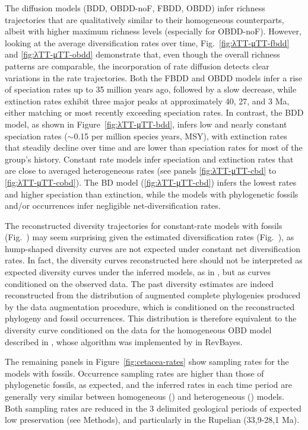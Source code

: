 \documentclass[oupdraft]{sysbio}
\begin{document}
The diffusion models (BDD, OBDD-noF, FBDD, OBDD) infer richness trajectories that are qualitatively similar to their homogeneous counterparts, albeit with higher maximum richness levels (especially for OBDD-noF). However, looking at the average diversification rates over time, Fig.~\ref{fig:λTT-μTT-fbdd} and \ref{fig:λTT-μTT-obdd} demonstrate that, even though the overall richness patterns are comparable, the incorporation of rate diffusion detects clear variations in the rate trajectories. Both the FBDD and OBDD models infer a rise of speciation rates up to 35 million years ago, followed by a slow decrease, while extinction rates exhibit three major peaks at approximately 40, 27, and 3 Ma, either matching or most recently exceeding speciation rates. In contrast, the BDD model, as shown in Figure~\ref{fig:λTT-μTT-bdd}, infers low and nearly constant speciation rates ($\sim$0.15 per million species years, MSY), with extinction rates that steadily decline over time and are lower than speciation rates for most of the group's history. Constant rate models infer speciation and extinction rates that are close to averaged heterogeneous rates (see panels \ref{fig:λTT-μTT-cbd} to \ref{fig:λTT-μTT-cobd}). The BD model (\ref{fig:λTT-μTT-cbd}) infers the lowest rates and higher speciation than extinction, while the models with phylogenetic fossils and/or occurrences infer negligible net-diversification rates.

The reconstructed diversity trajectories for constant-rate models with fossils (Fig.~) may seem surprising given the estimated diversification rates (Fig.~), as hump-shaped diversity curves are not expected under constant net diversification rates. In fact, the diversity curves reconstructed here should not be interpreted as expected diversity curves under the inferred models, as in \citet{etienne_diversity-dependence_2011, billaud_estimating_2019}, but as curves conditioned on the observed data. The past diversity estimates are indeed reconstructed from the distribution of augmented complete phylogenies produced by the data augmentation procedure, which is conditioned on the reconstructed phylogeny and fossil occurrences. This distribution is therefore equivalent to the diversity curve conditioned on the data for the homogeneous OBD model described in \citet{manceau_probability_2021}, whose algorithm was implemented by \citet{andreoletti_occurrence_2022} in RevBayes.

The remaining panels in Figure~\ref{fig:cetacea-rates} show sampling rates for the models with fossils. Occurrence sampling rates are higher than those of phylogenetic fossils, as expected, and the inferred rates in each time period are generally very similar between homogeneous () and heterogeneous () models. Both sampling rates are reduced in the 3 delimited geological periods of expected low preservation (see Methods), and particularly in the Rupelian (33,9-28,1 Ma).
\end{document}
